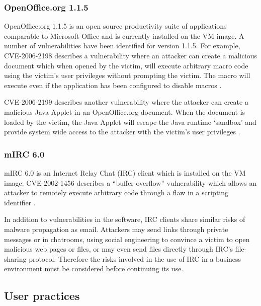 \subsubsection{OpenOffice.org 1.1.5}

OpenOffice.org 1.1.5 is an open source productivity suite of applications comparable to Microsoft Office and is currently installed on the VM image. A number of vulnerabilities have been identified for version 1.1.5. For example, CVE-2006-2198 describes a vulnerability where an attacker can create a malicious document which when opened by the victim, will execute arbitrary macro code using the victim's user privileges without prompting the victim. The macro will execute even if the application has been configured to disable macros \citep{MITRE2006a}.

CVE-2006-2199 describes another vulnerability where the attacker can create a malicious Java Applet in an OpenOffice.org document. When the document is loaded by the victim, the Java Applet will escape the Java runtime `sandbox' and provide system wide access to the attacker with the victim's user privileges \citep{MITRE2006b, SecurityTracker2006}.


\subsubsection{mIRC 6.0}

mIRC 6.0 is an Internet Relay Chat (IRC) client which is installed on the VM image. CVE-2002-1456 describes a ``buffer overflow'' vulnerability which allows an attacker to remotely execute arbitrary code through a flaw in a scripting identifier \citep{MITRE2003, Martin2002}.

In addition to vulnerabilities in the software, IRC clients share similar risks of malware propagation as email. Attackers may send links through private messages or in chatrooms, using social engineering to convince a victim to open malicious web pages or files, or may even send files directly through IRC's file-sharing protocol. Therefore the risks involved in the use of IRC in a business environment must be considered before continuing its use.

\subsection{User practices}

